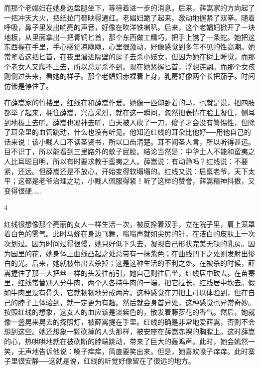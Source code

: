 而那个老娼妇在她身边盘腿坐下，等待着进一步的消息。后来，薛嵩家的方向起了一把冲天大火，把纸拉门都映得通红。老娼妇跪了起来，激动地握紧了双拳。随着呼吸，鼻子里发出响亮的声音，好像在吹洋铁喇叭。后来，这个老娼妇掀开了一块地板，从里面拿出一把青铜匕首，那个东西做工精巧，把手上镌了一条蛇。她把这东西握在手里，手心感觉凉飕飕，心里很激动，好像感觉到多年不见的性高潮。她常拿着这把匕首，在夜里潜进隔壁的房子去杀小妓女，但因为她在树上睡觉，而那个老女人又爬不上去，所以总是杀不到。现在她紧握匕首，浮想连翩。而那个女孩则侧过头来，看她的样子。那个老娼妇赤裸着上身，乳房好像两个长把茄子。时间仿佛是停住了。 

在薛嵩家的竹楼里，红线在和薛嵩作爱。她像一匹仰卧着的马，也就是说，把四肢都举了起来，拥住薛嵩，兴高采烈，就在这一瞬间，忽然把表情在脸上凝住，侧耳到地板上去听。薛嵩也凝神去听，白天被人砍了一刀，傻子才会没有警惕性，但除了耳朵里的血管跳动，什么也没有听见。他知道红线的耳朵比他好──用他自己的话来说：该小贱人口不读圣贤书，所以口齿清楚。耳不闻圣人言，所以听得甚远。目不识丁，所以能看到三里路外的蚊子屁股。结论当然是：中华士人不能和蛮夷之人比耳聪目明，所以有时要求教于蛮夷之人。薛嵩说：有动静吗？红线说：不要紧，还远。但薛嵩还是不放心，开始变得软塌塌的。红线又说：启禀老爷，天下太平；这都是老爷治理之功，小贱人佩服得紧！听了这样的赞誉，薛嵩精神抖擞，又变得很硬…… 

4 

红线很想像那个亮丽的女人一样生活一次，被反拴着双手，立在院子里，肩上笼罩着白色的雾气。此时马蜂在身边飞舞，嗡嗡声就如尖厉的针，在洁白的皮肤上一次次划过。因为时间过得很慢，她只好低下头去，凝视自己形状完美无缺的乳房。因为园里的花，她身体上曲线凸起之处总带有一抹紫色；在曲线凹下之处则发射出惨白的光。后来，她就被带出去杀掉；这是这种生活的不利之处。在被杀的时候，薛嵩握住了那一大把丝一样的头发往前引，她自己则往后坐，红线居中砍去。在苗寨里，红线常替别人分牛肉，两个人各持牛肉的一端，把它拉长，红线居中坎去。假如牛肉里没有骨头，它就韧韧地分成两片。这种感觉在刀把上可以体验到，但在自己的脖子上体验到，就一定更为有趣。然后就会身首异处，这种感觉也异常奇妙。按照红线的想象，这女人的血应该是淡紫色的，散发着藤萝花的香气。然后，她就像一盏晃来晃去的探照灯，被薛嵩提在手里。红线的确是非常地爱薛嵩，否则不会想到这些。她还想象一颗砍掉的人头那样，被安座在薛嵩赤裸的胸膛上。这时薛嵩的心，热哄哄地就在被砍断的脖端跳动，带来了巨大的轰鸣声。此时，她会嫣然一笑，无声地告诉他说：嗓子痒痒，简直要笑出来。但是，她喜欢嗓子痒痒。此时寨子里很安静──这就是说，红线的听觉好像留在了很远的地方。 

